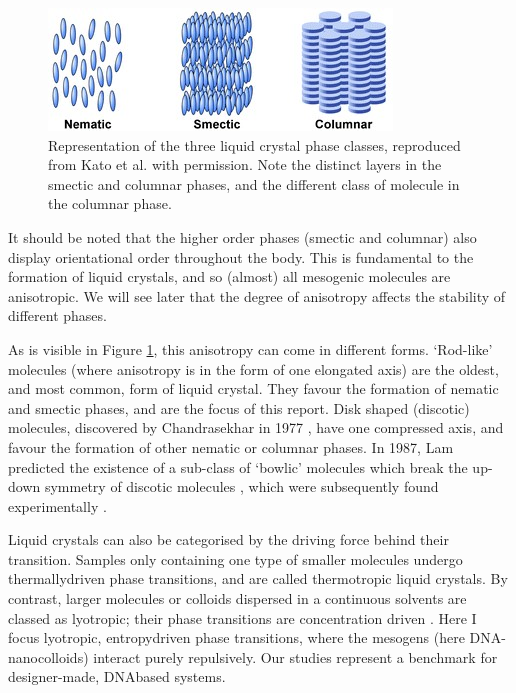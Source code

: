 \documentclass[11pt, a4paper]{article} %
\begin{document}
\begin{figure} [!ht]
	\centering
	\includegraphics[width=0.7\linewidth]{Figures/lc_phases_cropped}
	\caption{Representation of the three liquid crystal phase classes, reproduced from Kato et al. \cite{Kato2007} with permission. Note the distinct layers in the smectic and columnar phases, and the different class of molecule in the columnar phase.}
	\label{fig:lcphasescropped}
\end{figure}


It should be noted that the higher order phases (smectic and columnar) also display orientational order throughout the body. This is fundamental to the formation of liquid crystals, and so (almost) all mesogenic molecules are anisotropic. We will see later that the degree of anisotropy affects the stability of different phases. 

As is visible in Figure \ref{fig:lcphasescropped}, this anisotropy can come in different forms. `Rod-like' molecules (where anisotropy is in the form of one elongated axis) are the oldest, and most common, form of liquid crystal. They favour the formation of nematic and smectic phases, and are the focus of this report. Disk shaped (discotic) molecules, discovered by Chandrasekhar in 1977 \cite{Chandrasekhar1977}, have one compressed axis, and favour the formation of other nematic or columnar phases. In 1987, Lam predicted the existence of a sub-class of `bowlic' molecules which break the up-down symmetry of discotic molecules \cite{LinLei1988}, which were subsequently found experimentally \cite{Zimmermann1985, Malthete1985}.

Liquid crystals can also be categorised by the driving force behind their transition. Samples only containing one type of smaller molecules undergo thermally\textendash driven phase transitions, and are called thermotropic liquid crystals. By contrast, larger molecules or colloids dispersed in a continuous solvents are classed as lyotropic; their phase transitions are concentration driven \cite{DeGennes1993}. Here I focus lyotropic, entropy\textendash driven phase transitions, where the mesogens (here DNA-nanocolloids) interact purely repulsively. Our studies represent a benchmark for designer-made, DNA\textendash based systems.
\end{document}
